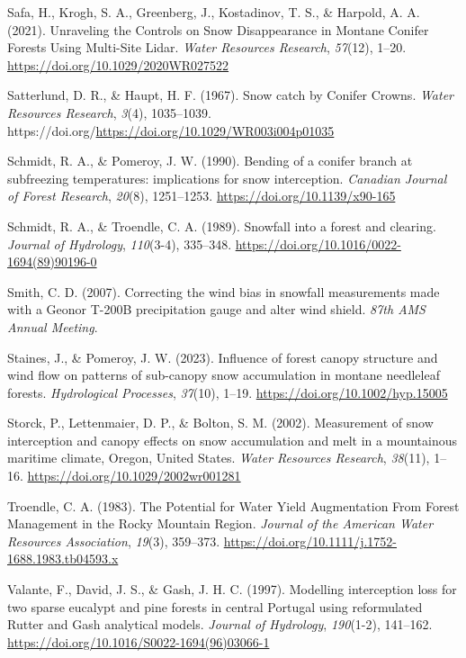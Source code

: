 \documentclass[
  letterpaper,
  DIV=11,
  numbers=noendperiod]{scrartcl}
\newlength{\cslhangindent}
\newenvironment{CSLReferences}[2] %
 {\begin{list}{}{%
  \setlength{\itemindent}{0pt}
  \setlength{\leftmargin}{0pt}
  \setlength{\parsep}{0pt}
  \ifodd #1
   \setlength{\leftmargin}{\cslhangindent}
   \setlength{\itemindent}{-1\cslhangindent}
  \fi
  \setlength{\itemsep}{#2\baselineskip}}}
 {\end{list}}
\begin{document}
\begin{CSLReferences}{1}{0}
Safa, H., Krogh, S. A., Greenberg, J., Kostadinov, T. S., \& Harpold, A.
A. (2021). {Unraveling the Controls on Snow Disappearance in Montane
Conifer Forests Using Multi-Site Lidar}. \emph{Water Resources
Research}, \emph{57}(12), 1--20.
\url{https://doi.org/10.1029/2020WR027522}

Satterlund, D. R., \& Haupt, H. F. (1967). {Snow catch by Conifer
Crowns}. \emph{Water Resources Research}, \emph{3}(4), 1035--1039.
https://doi.org/\url{https://doi.org/10.1029/WR003i004p01035}

Schmidt, R. A., \& Pomeroy, J. W. (1990). {Bending of a conifer branch
at subfreezing temperatures: implications for snow interception}.
\emph{Canadian Journal of Forest Research}, \emph{20}(8), 1251--1253.
\url{https://doi.org/10.1139/x90-165}

Schmidt, R. A., \& Troendle, C. A. (1989). {Snowfall into a forest and
clearing}. \emph{Journal of Hydrology}, \emph{110}(3-4), 335--348.
\url{https://doi.org/10.1016/0022-1694(89)90196-0}

Smith, C. D. (2007). {Correcting the wind bias in snowfall measurements
made with a Geonor T-200B precipitation gauge and alter wind shield}.
\emph{87th AMS Annual Meeting}.

Staines, J., \& Pomeroy, J. W. (2023). {Influence of forest canopy
structure and wind flow on patterns of sub-canopy snow accumulation in
montane needleleaf forests}. \emph{Hydrological Processes},
\emph{37}(10), 1--19. \url{https://doi.org/10.1002/hyp.15005}

Storck, P., Lettenmaier, D. P., \& Bolton, S. M. (2002). {Measurement of
snow interception and canopy effects on snow accumulation and melt in a
mountainous maritime climate, Oregon, United States}. \emph{Water
Resources Research}, \emph{38}(11), 1--16.
\url{https://doi.org/10.1029/2002wr001281}

Troendle, C. A. (1983). {The Potential for Water Yield Augmentation From
Forest Management in the Rocky Mountain Region}. \emph{Journal of the
American Water Resources Association}, \emph{19}(3), 359--373.
\url{https://doi.org/10.1111/j.1752-1688.1983.tb04593.x}

Valante, F., David, J. S., \& Gash, J. H. C. (1997). {Modelling
interception loss for two sparse eucalypt and pine forests in central
Portugal using reformulated Rutter and Gash analytical models}.
\emph{Journal of Hydrology}, \emph{190}(1-2), 141--162.
\url{https://doi.org/10.1016/S0022-1694(96)03066-1}


\end{CSLReferences}
\end{document}
